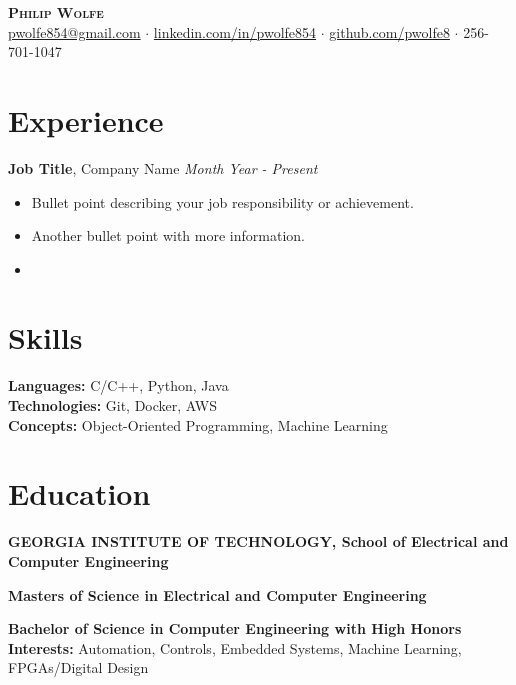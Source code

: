 \documentclass[11pt, a4paper]{article}
\newcommand{\header}[7]{
  \begin{center}
    {\LARGE \bfseries\scshape #1}\\
    \vspace{2mm}
    \href{mailto:#2}{#2} $\cdot$ \href{#3}{#6} $\cdot$ \href{#4}{#7} $\cdot$ #5\\
    \vspace{2mm}
  \end{center}
}
\begin{document}
\header{Philip Wolfe}{pwolfe854@gmail.com}{https://www.linkedin.com/in/pwolfe854}{https://github.com/pwolfe8}{256-701-1047}{linkedin.com/in/pwolfe854}{github.com/pwolfe8}



\section*{Experience}
\textbf{Job Title}, Company Name \textit{Month Year - Present}\\
\begin{itemize}
  \item Bullet point describing your job responsibility or achievement.
  \item Another bullet point with more information.
  \item \fpgaLong
  
\end{itemize}

\section*{Skills}
\textbf{Languages:} C/C++, Python, Java\\
\textbf{Technologies:} Git, Docker, AWS\\
\textbf{Concepts:} Object-Oriented Programming, Machine Learning

\section*{Education}
{\small
\textbf{GEORGIA INSTITUTE OF TECHNOLOGY, School of Electrical and Computer Engineering}\par
\textbf{Masters of Science in Electrical and Computer Engineering}\par
\textbf{Bachelor of Science in Computer Engineering with High Honors}\\
\textbf{Interests:} Automation, Controls, Embedded Systems, Machine Learning, FPGAs/Digital Design
}
\end{document}

